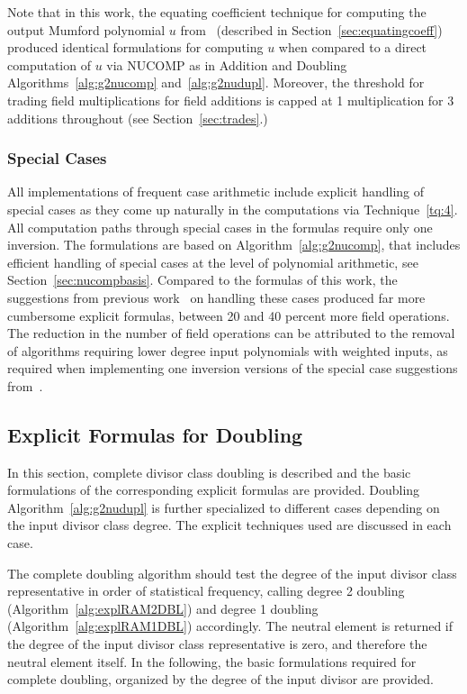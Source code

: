 Note that in this work, the equating coefficient technique for computing the
output Mumford polynomial $u$ from~\cite{CostelloLauter_geo_2011} (described in
Section~\ref{sec:equatingcoeff}) produced identical formulations for computing
$u$ when compared to a direct computation of $u$ via NUCOMP as in Addition and
Doubling Algorithms~\ref{alg:g2nucomp} and~\ref{alg:g2nudupl}. Moreover, the
threshold for trading field multiplications for field additions is capped at 1
multiplication for 3 additions throughout (see Section~\ref{sec:trades}.)

\subsubsection{Special Cases}
All implementations of frequent case arithmetic include explicit handling of
special cases as they come up naturally in the computations via
Technique~\ref{tq:4}. All computation paths through special cases in the
formulas require only one inversion. The formulations are based on
Algorithm~\ref{alg:g2nucomp}, that includes efficient handling of special cases
at the level of polynomial arithmetic, see Section~\ref{sec:nucompbasis}.
Compared to the formulas of this work, the suggestions from previous
work~\cite{Lange_explicit_2005} on handling these cases produced far more
cumbersome explicit formulas, between 20 and 40 percent more field
operations. The reduction in the number of field operations can be
attributed to the removal of algorithms requiring lower degree input polynomials with weighted
inputs, as required when implementing one inversion versions of the special case
suggestions from~\cite{Lange_explicit_2005}. 


\subsection{Explicit Formulas for Doubling}
\label{sec:g2RAMDBL} 
In this section, complete divisor class doubling is described and the basic
formulations of the corresponding explicit formulas are provided. Doubling
Algorithm~\ref{alg:g2nudupl} is further specialized to different cases
depending on the input divisor class degree. The explicit techniques used are
discussed in each case. 

The complete doubling algorithm should test the degree of the input divisor
class representative in order of statistical frequency, calling degree 2
doubling (Algorithm~\ref{alg:explRAM2DBL}) and degree 1 doubling
(Algorithm~\ref{alg:explRAM1DBL}) accordingly. The neutral element is returned
if the degree of the input divisor class representative is zero, and therefore
the neutral element itself.  In the following, the basic formulations required
for complete doubling, organized by the degree of the input divisor are
provided.

